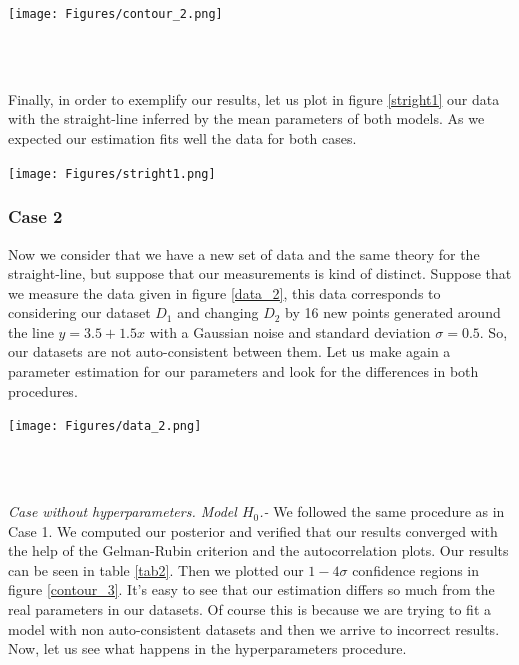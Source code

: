 \documentclass[onecolumn,           %
               showpacs,            %
               preprintnumbers,     %
               aps,                 %
               prl,          	    %
               letterpaper,             %
               superscriptaddress,      %
               nofootinbib,         %
               tightenlines,        %
               floats,floatfix      %
               ,usenatbib,
               ]{revtex4-1}
\begin{document}
\begin{minipage}{\textwidth}
\centering
\texttt{[image: Figures/contour\_2.png]}
\label{contour_2}
\end{minipage}\\ $ $

Finally, in order to exemplify our results, let us plot in figure \ref{stright1} our data with the straight-line inferred by the mean parameters of both models. As we expected our estimation fits well the data for both cases.  

\begin{minipage}{\textwidth}
\centering
\texttt{[image: Figures/stright1.png]}
\label{stright1}
\end{minipage}

\subsubsection{Case 2}

Now we consider that we have a new set of data and the same theory for the straight-line, but suppose that our measurements is kind of distinct. Suppose that we measure the data given in  figure \ref{data_2}, this data corresponds to considering our dataset $D_1$ and changing $D_2$ by 16 new points generated around the line $y=3.5+1.5x$ with a Gaussian noise and standard deviation $\sigma = 0.5$. So, our datasets are not auto-consistent between them. Let us make again a parameter estimation for our parameters and look for the differences in both procedures.

\begin{minipage}{\textwidth}
\centering
\texttt{[image: Figures/data\_2.png]}
\label{data_2}
\end{minipage}\\ $ $

\textit{Case without hyperparameters. Model $H_0$.-} We followed the same procedure as in Case 1. We computed our posterior and verified that our results converged with the help of the Gelman-Rubin criterion and the autocorrelation plots. Our results can be seen in table \ref{tab2}. Then we plotted our $1-4 \sigma$ confidence regions in figure \ref{contour_3}. It's easy to see that our estimation differs so much from the real parameters in our datasets. Of course this is because we are trying to fit a model with non auto-consistent datasets and then we arrive to incorrect results. Now, let us see what happens in the hyperparameters procedure.    
\end{document}
